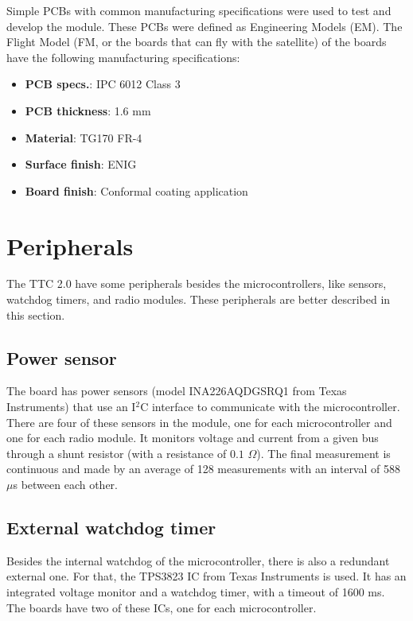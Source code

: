 Simple PCBs with common manufacturing specifications were used to test and develop the module. These PCBs were defined as Engineering Models (EM). The Flight Model (FM, or the boards that can fly with the satellite) of the boards have the following manufacturing specifications:

\begin{itemize}
    \item \textbf{PCB specs.}: IPC 6012 Class 3
    \item \textbf{PCB thickness}: 1.6 mm
    \item \textbf{Material}: TG170 FR-4
    \item \textbf{Surface finish}: ENIG
    \item \textbf{Board finish}: Conformal coating application
\end{itemize}

\section{Peripherals}

The TTC 2.0 have some peripherals besides the microcontrollers, like sensors, watchdog timers, and radio modules. These peripherals are better described in this section.

\subsection{Power sensor}

The board has power sensors (model INA226AQDGSRQ1 from Texas Instruments) that use an I$^{2}$C interface to communicate with the microcontroller. There are four of these sensors in the module, one for each microcontroller and one for each radio module. It monitors voltage and current from a given bus through a shunt resistor (with a resistance of $0.1$ $\Omega$). The final measurement is continuous and made by an average of 128 measurements with an interval of 588 $\mu$s between each other.

\subsection{External watchdog timer}

Besides the internal watchdog of the microcontroller, there is also a redundant external one. For that, the TPS3823 IC from Texas Instruments is used. It has an integrated voltage monitor and a watchdog timer, with a timeout of 1600 ms. The boards have two of these ICs, one for each microcontroller.

